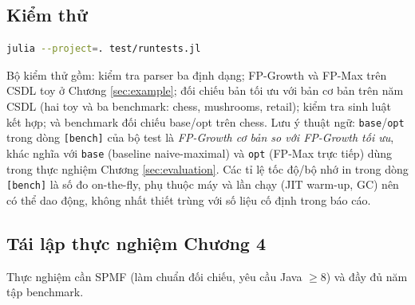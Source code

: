 \subsection{Kiểm thử}

\begin{lstlisting}[language=bash, caption={Chạy bộ kiểm thử tự động.}]
julia --project=. test/runtests.jl
\end{lstlisting}

Bộ kiểm thử gồm: kiểm tra parser ba định dạng; FP-Growth và FP-Max trên CSDL toy ở Chương \ref{sec:example}; đối chiếu bản tối ưu với bản cơ bản trên năm CSDL (hai toy và ba benchmark: chess, mushrooms, retail); kiểm tra sinh luật kết hợp; và benchmark đối chiếu base/opt trên chess. Lưu ý thuật ngữ: \texttt{base}/\texttt{opt} trong dòng \texttt{[bench]} của bộ test là \emph{FP-Growth cơ bản so với FP-Growth tối ưu}, khác nghĩa với \texttt{base} (baseline naive-maximal) và \texttt{opt} (FP-Max trực tiếp) dùng trong thực nghiệm Chương \ref{sec:evaluation}. Các tỉ lệ tốc độ/bộ nhớ in trong dòng \texttt{[bench]} là số đo on-the-fly, phụ thuộc máy và lần chạy (JIT warm-up, GC) nên có thể dao động, không nhất thiết trùng với số liệu cố định trong báo cáo.

\subsection{Tái lập thực nghiệm Chương 4}

Thực nghiệm cần SPMF (làm chuẩn đối chiếu, yêu cầu Java $\geq 8$) và đầy đủ năm tập benchmark.

